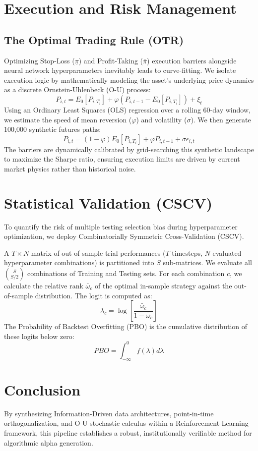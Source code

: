 \documentclass[12pt, a4paper]{article}
\begin{document}
\section{Execution and Risk Management}

\subsection{The Optimal Trading Rule (OTR)}
Optimizing Stop-Loss ($\underline{\pi}$) and Profit-Taking ($\bar{\pi}$) execution barriers alongside neural network hyperparameters inevitably leads to curve-fitting. We isolate execution logic by mathematically modeling the asset's underlying price dynamics as a discrete Ornstein-Uhlenbeck (O-U) process:
$$ P_{i,t} = E_0[P_{i,T_i}] + \varphi(P_{i,t-1} - E_0[P_{i,T_i}]) + \xi_t $$
Using an Ordinary Least Squares (OLS) regression over a rolling 60-day window, we estimate the speed of mean reversion ($\varphi$) and volatility ($\sigma$). We then generate 100,000 synthetic futures paths:
$$ P_{i,t} = (1 - \varphi)E_0[P_{i,T_i}] + \varphi P_{i,t-1} + \sigma \epsilon_{i,t} $$
The barriers are dynamically calibrated by grid-searching this synthetic landscape to maximize the Sharpe ratio, ensuring execution limits are driven by current market physics rather than historical noise.

\section{Statistical Validation (CSCV)}
To quantify the risk of multiple testing selection bias during hyperparameter optimization, we deploy Combinatorially Symmetric Cross-Validation (CSCV).

A $T \times N$ matrix of out-of-sample trial performances ($T$ timesteps, $N$ evaluated hyperparameter combinations) is partitioned into $S$ sub-matrices. We evaluate all $\binom{S}{S/2}$ combinations of Training and Testing sets. For each combination $c$, we calculate the relative rank $\bar{\omega}_c$ of the optimal in-sample strategy against the out-of-sample distribution. The logit is computed as:
$$ \lambda_c = \log\left[\frac{\bar{\omega}_c}{1 - \bar{\omega}_c}\right] $$
The Probability of Backtest Overfitting (PBO) is the cumulative distribution of these logits below zero:
$$ PBO = \int_{-\infty}^{0} f(\lambda) d\lambda $$

\section{Conclusion}
By synthesizing Information-Driven data architectures, point-in-time orthogonalization, and O-U stochastic calculus within a Reinforcement Learning framework, this pipeline establishes a robust, institutionally verifiable method for algorithmic alpha generation.
\end{document}
